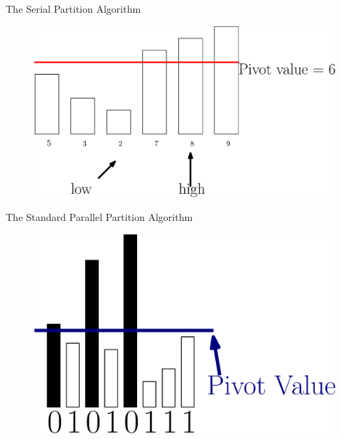 \documentclass[xcolor=x11names, svgnames, rgb]{beamer}
\begin{document}
\begin{frame}[t]{The Serial Partition Algorithm}
\begin{figure}
\begin{overprint}
		\includegraphics[width=\linewidth]{imgs/serialPartition/serialPartition4.eps}
		\end{overprint}
	\end{figure}	
\end{frame}

\begin{frame}[t]{The Standard Parallel Partition Algorithm }
	\begin{figure}
		\includegraphics[width=\linewidth]{imgs/standardAlg/standardAlg1.eps}
	\end{figure}
\end{frame}
\end{document}
